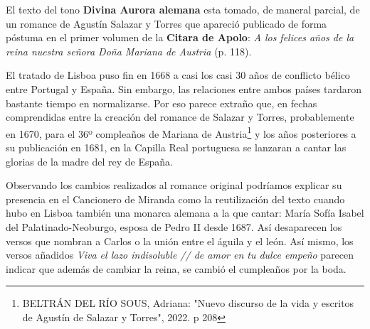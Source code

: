 El texto del tono \textbf{Divina Aurora alemana} esta tomado, de maneral parcial, de un romance de Agustín Salazar y Torres que apareció publicado de forma póstuma en el primer volumen de la \textbf{Citara de Apolo}: \textit{A los felices años de la reina nuestra señora Doña Mariana de Austria} (p. 118). 


El tratado de Lisboa puso fin en 1668 a casi los casi 30 años de conflicto bélico entre Portugal y España. Sin embargo, las relaciones entre ambos países tardaron bastante tiempo en normalizarse. Por eso parece extraño que, en fechas comprendidas entre la creación del romance de Salazar y Torres, probablemente en 1670, para el 36º compleaños de Mariana de Austria\footnote{BELTRÁN DEL RÍO SOUS, Adriana: "Nuevo discurso de la vida y escritos de Agustín de Salazar y Torres", 2022. p 208} y los años posteriores a su publicación en 1681, en la Capilla Real portuguesa se lanzaran a cantar las glorias de la madre del rey de España.

Observando los cambios realizados al romance original podríamos explicar su presencia en el Cancionero de Miranda como la reutilización del texto cuando hubo en Lisboa también una monarca alemana a la que cantar: María Sofía Isabel del Palatinado-Neoburgo, esposa de Pedro II desde 1687. Así desaparecen los versos que nombran a Carlos o la unión entre el águila y el león. Así mismo, los versos añadidos \textit{Viva el lazo indisoluble // de amor en tu dulce empeño} parecen indicar que además de cambiar la reina, se cambió el cumpleaños por la boda.

